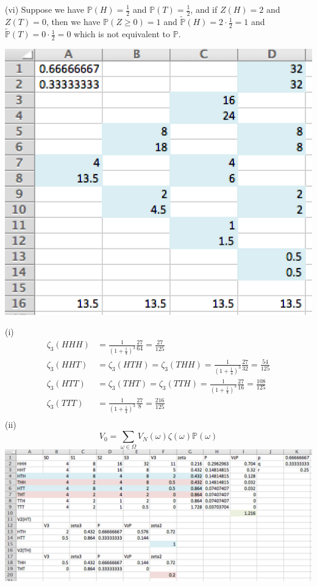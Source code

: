 \documentclass[12pt]{article}
\newenvironment{Exercise}[2][Exercise]{\begin{trivlist}
		\item[\hskip \labelsep {\bfseries #1}\hskip \labelsep {\bfseries #2.}]}{\end{trivlist}}
\begin{document}
	(vi) Suppose we have $\mathbb{P}(H) = \frac{1}{2}$ and $\mathbb{P}(T) = \frac{1}{2}$, and if $Z(H)=2$ and $Z(T) = 0$, then we have  $\mathbb{P}(Z\ge 0) = 1$ and $\tilde{\mathbb{P}}(H) = 2\cdot\frac{1}{2} = 1$ and $\tilde{\mathbb{P}}(T) = 0 \cdot \frac{1}{2} = 0$ which is not equivalent to $\mathbb{P}$. 
	\begin{Exercise}{3} \end{Exercise}
	\includegraphics{Ex3_3.png}
	\begin{Exercise}{4} \end{Exercise}
	(i) 
	\begin{align*}
	\zeta_3(HHH) &= \frac{1}{(1+\frac{1}{4})^3}\frac{27}{64}=\frac{27}{125}\\
	\zeta_3(HHT) &= \zeta_3(HTH) = \zeta_3(THH) = \frac{1}{(1+\frac{1}{4})^3}\frac{27}{32}=\frac{54}{125}\\
	\zeta_3(HTT) &= \zeta_3(THT) = \zeta_3(TTH) = \frac{1}{(1+\frac{1}{4})^3}\frac{27}{16}=\frac{108}{125}\\
	\zeta_3(TTT) &= \frac{1}{(1+\frac{1}{4})^3}\frac{27}{8}=\frac{216}{125}\\
	\end{align*}
	(ii) $$V_0 = \sum_{\omega\in\Omega}V_N(\omega)\zeta(\omega)\mathbb{P}(\omega)$$
	\includegraphics[scale=0.6]{Ex3_4.png}\\
\end{document}
